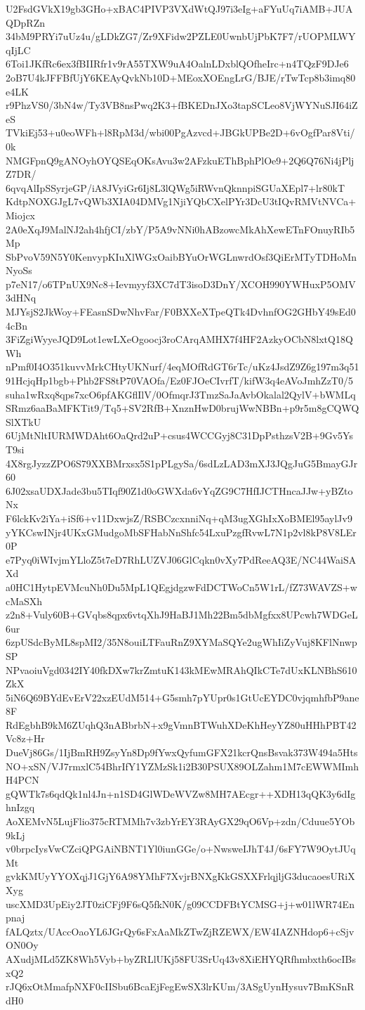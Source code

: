 U2FsdGVkX19gb3GHo+xBAC4PIVP3VXdWtQJ97i3eIg+aFYuUq7iAMB+JUAQDpRZn
34bM9PRYi7uUz4u/gLDkZG7/Zr9XFidw2PZLE0UwnbUjPbK7F7/rUOPMLWYqIjLC
6Toi1JKfRc6ex3fBIIRfr1v9rA55TXW9uA4OalnLDxblQOfheIrc+n4TQzF9DJe6
2oB7U4kJFFBfUjY6KEAyQvkNb10D+MEoxXOEngLrG/BJE/rTwTcp8b3imq80e4LK
r9PhzVS0/3bN4w/Ty3VB8nsPwq2K3+fBKEDnJXo3tapSCLeo8VjWYNuSJI64iZeS
TVkiEj53+u0eoWFh+l8RpM3d/wbi00PgAzvcd+JBGkUPBe2D+6vOgfPar8Vti/0k
NMGFpnQ9gANOyhOYQSEqOKsAvu3w2AFzkuEThBphPlOe9+2Q6Q76Ni4jPljZ7DR/
6qvqAlIpSSyrjeGP/iA8JVyiGr6Ij8L3lQWg5iRWvnQknnpiSGUaXEpl7+lr80kT
KdtpNOXGJgL7vQWb3XIA04DMVg1NjiYQbCXelPYr3DcU3tIQvRMVtNVCa+Miojcx
2A0eXqJ9MalNJ2ah4hfjCI/zbY/P5A9vNNi0hABzowcMkAhXewETnFOnuyRIb5Mp
SbPvoV59N5Y0KenvypKIuXlWGxOaibBYuOrWGLnwrdOsf3QiErMTyTDHoMnNyoSs
p7eN17/o6TPnUX9Nc8+Ievmyyf3XC7dT3isoD3DnY/XCOH990YWHuxP5OMV3dHNq
MJYsjS2JkWoy+FEasnSDwNhvFar/F0BXXeXTpeQTk4DvhnfOG2GHbY49sEd04cBn
3FiZgiWyyeJQD9Lot1ewLXeOgoocj3roCArqAMHX7f4HF2AzkyOCbN8lxtQ18QWh
nPmf0I4O351kuvvMrkCHtyUKNurf/4eqMOfRdGT6rTc/uKz4JsdZ9Z6g197m3q51
91HcjqHp1bgb+Phb2FS8tP70VAOfa/Ez0FJOeCIvrfT/kifW3q4eAVoJmhZzT0/5
suha1wRxq8qps7xcO6pfAKGflIlV/0OfmqrJ3TmzSaJaAvbOkalal2QylV+bWMLq
SRmz6aaBaMFKTit9/Tq5+SV2RfB+XnznHwD0brujWwNBBn+p9r5m8gCQWQSlXTkU
6UjMtNltIURMWDAht6OaQrd2uP+csus4WCCGyj8C31DpPsthzsV2B+9Gv5YsT9si
4X8rgJyzzZPO6S79XXBMrxsx5S1pPLgySa/6sdLzLAD3mXJ3JQgJuG5BmayGJr60
6J02xsaUDXJade3bu5TIqf90Z1d0oGWXda6vYqZG9C7HfIJCTHncaJJw+yBZtoNx
F6lckKv2iYa+iSf6+v11DxwjsZ/RSBCzcxnniNq+qM3ugXGhIxXoBMEl95aylJv9
yYKCswINjr4UKxGMudgoMbSFHabNnShfc54LxuPzgfRvwL7N1p2vl8kP8V8LEr0P
e7Pyq0iWIvjmYLloZ5t7eD7RhLUZVJ06GlCqkn0vXy7PdReeAQ3E/NC44WaiSAXd
a0HC1HytpEVMcuNh0Du5MpL1QEgjdgzwFdDCTWoCn5W1rL/fZ73WAVZS+wcMaSXh
z2n8+Vuly60B+GVqbs8qpx6vtqXhJ9HaBJ1Mh22Bm5dbMgfxx8UPcwh7WDGeL6ur
6zpUSdcByML8spMI2/35N8ouiLTFauRnZ9XYMaSQYe2ugWhIiZyVuj8KFlNnwpSP
NPvaoiuVgd0342IY40fkDXw7krZmtuK143kMEwMRAhQIkCTe7dUxKLNBhS610ZkX
5iN6Q69BYdEvErV22xzEUdM514+G5smh7pYUpr0s1GtUcEYDC0vjqmhfbP9ane8F
RdEgbhB9kM6ZUqhQ3nABbrbN+x9gVmnBTWuhXDeKhHeyYZ80uHHhPBT42Vc8z+Hr
DueVj86Gs/1IjBmRH9ZsyYn8Dp9fYwxQyfumGFX21kcrQnsBsvak373W494a5Hts
NO+xSN/VJ7rmxlC54BhrIfY1YZMzSk1i2B30PSUX89OLZahm1M7cEWWMImhH4PCN
gQWTk7s6qdQk1nl4Jn+n1SD4GlWDeWVZw8MH7AEcgr++XDH13qQK3y6dIghnIzgq
AoXEMvN5LujFlio375cRTMMh7v3zbYrEY3RAyGX29qO6Vp+zdn/Cduue5YOb9kLj
v0brpcIysVwCZciQPGAiNBNT1Yl0iunGGe/o+NwsweIJhT4J/6sFY7W9OytJUqMt
gvkKMUyYYOXqjJ1GjY6A98YMhF7XvjrBNXgKkGSXXFrlqjljG3ducaoesURiXXyg
uscXMD3UpEiy2JT0ziCFj9F6sQ5fkN0K/g09CCDFBtYCMSG+j+w01lWR74Enpnaj
fALQztx/UAccOaoYL6JGrQy6sFxAaMkZTwZjRZEWX/EW4IAZNHdop6+cSjvON0Oy
AXudjMLd5ZK8Wh5Vyb+byZRLlUKj58FU3SrUq43v8XiEHYQRfhmbxth6ocIBsxQ2
rJQ6xOtMmafpNXF0cIISbu6BcaEjFegEwSX3lrKUm/3ASgUynHysuv7BmKSnRdH0
